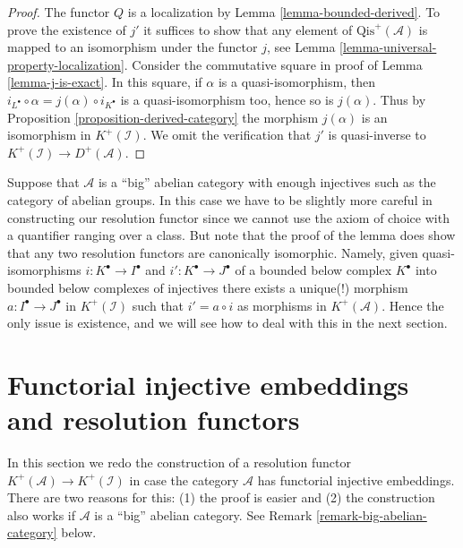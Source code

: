 \begin{proof}
The functor $Q$ is a localization by
Lemma \ref{lemma-bounded-derived}.
To prove the existence of $j'$ it suffices to show that any element of
$\text{Qis}^{+}(\mathcal{A})$ is mapped to an isomorphism under
the functor $j$, see Lemma \ref{lemma-universal-property-localization}.
Consider the commutative square in proof of
Lemma \ref{lemma-j-is-exact}. In this square, if $\alpha$ is a
quasi-isomorphism, then $i_{L^\bullet}\circ\alpha=j(\alpha)\circ i_{K^\bullet}$
is a quasi-isomorphism too, hence so is $j(\alpha)$. Thus by
Proposition \ref{proposition-derived-category} the morphism
$j(\alpha)$ is an isomorphism in $K^+(\mathcal{I})$. We omit the
verification that $j'$ is quasi-inverse to
$K^{+}(\mathcal{I}) \to D^{+}(\mathcal{A})$.
\end{proof}

\begin{remark}
\label{remark-big-localization}
Suppose that $\mathcal{A}$ is a ``big'' abelian category with enough injectives
such as the category of abelian groups. In this case we have to be slightly
more careful in constructing our resolution functor since we cannot use
the axiom of choice with a quantifier ranging over a class. But note that
the proof of the lemma does show that any two resolution functors are
canonically isomorphic. Namely, given quasi-isomorphisms
$i : K^\bullet \to I^\bullet$ and $i' : K^\bullet \to J^\bullet$ of
a bounded below complex $K^\bullet$ into bounded below complexes of injectives
there exists a unique(!) morphism $a : I^\bullet \to J^\bullet$
in $K^{+}(\mathcal{I})$ such that $i' = a \circ i$ as morphisms in
$K^{+}(\mathcal{A})$. Hence the only issue is existence, and we will see how
to deal with this in the next section.
\end{remark}










\section{Functorial injective embeddings and resolution functors}
\label{section-functorial-injective-resolutions}

\noindent
In this section we redo the construction of a resolution functor
$K^{+}(\mathcal{A}) \to K^{+}(\mathcal{I})$ in case the
category $\mathcal{A}$ has functorial injective embeddings.
There are two reasons for this: (1) the proof is easier and (2)
the construction also works if $\mathcal{A}$ is a ``big'' abelian
category. See
Remark \ref{remark-big-abelian-category}
below.

